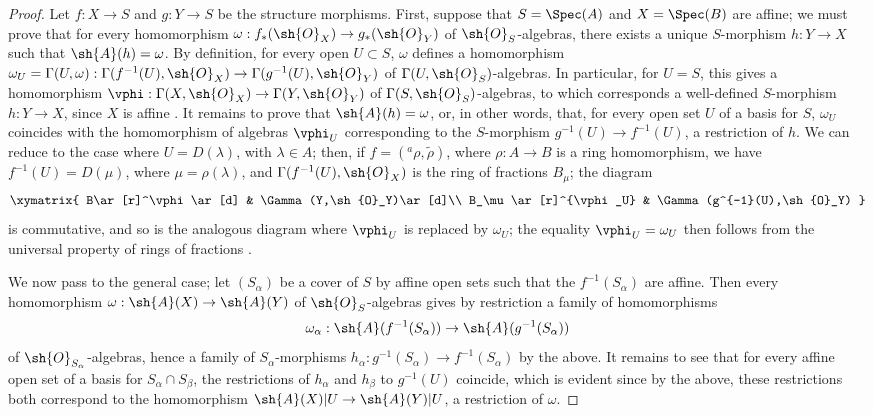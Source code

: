 \begin{proof}
Let $f:X\to S$ and $g:Y\to S$ be the structure morphisms.
First, suppose that $S=\Spec(A)$ and $X=\Spec(B)$ are affine; we must prove that for every homomorphism $\omega:f_*(\sh{O}_X)\to g_*(\sh{O}_Y)$ of $\sh{O}_S$-algebras, there exists a unique $S$-morphism $h:Y\to X$ such that $\sh{A}(h)=\omega$.
By definition, for every open $U\subset S$, $\omega$ defines a homomorphism $\omega_U=\Gamma(U,\omega):\Gamma(f^{-1}(U),\sh{O}_X)\to\Gamma(g^{-1}(U),\sh{O}_Y)$ of $\Gamma(U,\sh{O}_S)$-algebras.
In particular, for $U=S$, this gives a homomorphism $\vphi:\Gamma(X,\sh{O}_X)\to\Gamma(Y,\sh{O}_Y)$ of $\Gamma(S,\sh{O}_S)$-algebras, to which corresponds a well-defined $S$-morphism $h:Y\to X$, since $X$ is affine .
It remains to prove that $\sh{A}(h)=\omega$, or, in other words, that, for every open set $U$ of a basis for $S$, $\omega_U$ coincides with the homomorphism of algebras $\vphi_U$ corresponding to the $S$-morphism $g^{-1}(U)\to f^{-1}(U)$, a restriction of $h$.
We can reduce to the case where $U=D(\lambda)$, with $\lambda\in A$; then, if $f=({}^a\rho,\widetilde{\rho})$, where $\rho:A\to B$ is a ring homomorphism, we have $f^{-1}(U)=D(\mu)$, where $\mu=\rho(\lambda)$, and $\Gamma(f^{-1}(U),\sh{O}_X)$ is the ring of fractions $B_\mu$; the diagram
\[
  \xymatrix{
    B\ar[r]^\vphi\ar[d] &
    \Gamma(Y,\sh{O}_Y)\ar[d]\\
    B_\mu\ar[r]^{\vphi_U} &
    \Gamma(g^{-1}(U),\sh{O}_Y)
  }
\]
is commutative, and so is the analogous diagram where $\vphi_U$ is replaced by $\omega_U$; the equality $\vphi_U=\omega_U$ then follows from the universal property of rings of fractions .

We now pass to the general case; let $(S_\alpha)$ be a cover of $S$ by affine open sets
such that the $f^{-1}(S_\alpha)$ are affine.
Then every homomorphism $\omega:\sh{A}(X)\to\sh{A}(Y)$ of $\sh{O}_S$-algebras gives by restriction a family of homomorphisms
\[
  \omega_\alpha:\sh{A}(f^{-1}(S_\alpha))\to\sh{A}(g^{-1}(S_\alpha))
\]
of $\sh{O}_{S_\alpha}$-algebras, hence a family of $S_\alpha$-morphisms $h_\alpha:g^{-1}(S_\alpha)\to f^{-1}(S_\alpha)$ by the above.
It remains to see that for every affine open set of a basis for $S_\alpha\cap S_\beta$, the restrictions of $h_\alpha$ and $h_\beta$ to $g^{-1}(U)$ coincide, which is evident since by the above, these restrictions both correspond to the homomorphism $\sh{A}(X)|U\to\sh{A}(Y)|U$, a restriction of $\omega$.
\end{proof}


